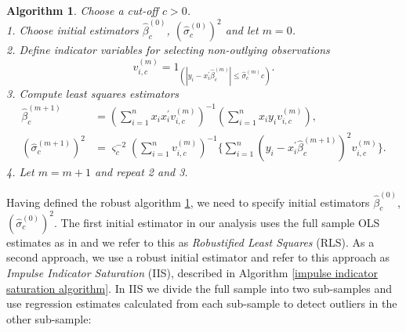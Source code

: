 \documentclass[11pt, letterpaper]{article}
\newtheorem{algorithm}{Algorithm}
\numberwithin{algorithm}{section}
\numberwithin{assumption}{section}
\numberwithin{lemma}{section}
\numberwithin{theorem}{section}
\numberwithin{corollary}{section}
\numberwithin{remark}{section}
\numberwithin{equation}{section}
\numberwithin{figure}{section}
\numberwithin{table}{section}
\begin{document}
\begin{algorithm} \label{iterated 1-step Huber-skip M-estimator with the same cut-off c}
Choose a cut-off $c > 0$. \\
1. Choose initial estimators $\widehat{\beta}_{c}^{(0)}$, $(\widehat{\sigma}_{c}^{(0)})^{2}$ and let $m = 0$. \\
2. Define indicator variables for selecting non-outlying observations
\begin{equation} \label{iterated 1-step Huber-skip M-indicator with subscript c}
    v_{i, c}^{(m)}
    = 1_{(|y_{i} - x_{i}^{\prime}\widehat{\beta}_{c}^{(m)}|
    \le \widehat{\sigma}_{c}^{(m)} c)}.
\end{equation}
3. Compute least squares estimators
\begin{align}
    \widehat{\beta}_{c}^{(m+1)} &
    = (\sum_{i=1}^{n} x_{i}x_{i}^{\prime} v_{i, c}^{(m)})^{-1}
    (\sum_{i=1}^{n} x_{i}y_{i}  v_{i, c}^{(m)}),
    \label{iterated 1-step Huber-skip M-estimator with subscript c} \\
    (\widehat{\sigma}_{c}^{(m+1)})^{2} &
    = \varsigma_{c}^{-2} (\sum_{i=1}^{n} v_{i, c}^{(m)})^{-1}
    \{ \sum_{i=1}^{n} (y_{i} - x_{i}^{\prime} \widehat{\beta}_{c}^{(m+1)})^{2} v_{i, c}^{(m)} \}.
    \label{iterated regression variance estimator with subscript c}
\end{align}
4. Let $m = m + 1$ and repeat 2 and 3.
\end{algorithm}

Having defined the robust algorithm \ref{iterated 1-step Huber-skip M-estimator with the same cut-off c}, we need to specify initial estimators $\widehat{\beta}_{c}^{(0)}$, $(\widehat{\sigma}_{c}^{(0)})^{2}$. The first initial estimator in our analysis uses the full sample OLS estimates as in \cite{acemoglu2019democracy} and we refer to this as \emph{Robustified Least Squares} (RLS). As a second approach, we use a robust initial estimator and refer to this approach as \emph{Impulse Indicator Saturation} (IIS), described in Algorithm \ref{impulse indicator saturation algorithm}. In IIS we divide the full sample into two sub-samples and use regression estimates calculated from each sub-sample to detect outliers in the other sub-sample:

\end{document}
